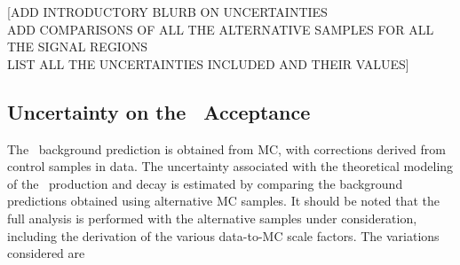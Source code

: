 
[ADD INTRODUCTORY BLURB ON UNCERTAINTIES \\
ADD COMPARISONS OF ALL THE ALTERNATIVE SAMPLES FOR ALL THE SIGNAL
REGIONS \\
LIST ALL THE UNCERTAINTIES INCLUDED AND THEIR VALUES]

\subsection{Uncertainty on the \ttll\ Acceptance}

The \ttbar\ background prediction is obtained from MC, with corrections
derived from control samples in data. The uncertainty associated with
the theoretical modeling of the \ttbar\ production and decay is
estimated by comparing the background predictions obtained using 
alternative MC samples. It should be noted that the full analysis is
performed with the alternative samples under consideration, 
including the derivation of the various data-to-MC scale factors. 
The variations considered are

